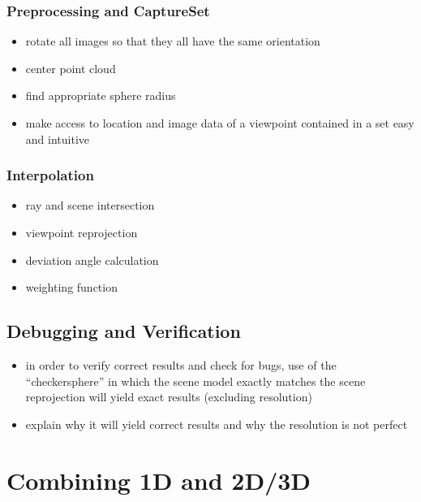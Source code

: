 \subsubsection{Preprocessing and CaptureSet}
\begin{itemize}
  \item rotate all images so that they all have the same orientation
  \item center point cloud
  \item find appropriate sphere radius
  \item make access to location and image data of a viewpoint contained in a set easy and intuitive
\end{itemize}

\subsubsection{Interpolation}
\begin{itemize}
  \item ray and scene intersection
  \item viewpoint reprojection
  \item deviation angle calculation
  \item weighting function
\end{itemize}

\subsection{Debugging and Verification}
\begin{itemize}
  \item in order to verify correct results and check for bugs, use of the ``checkersphere'' in which the scene model exactly matches the scene \ar reprojection will yield exact results (excluding resolution)
  \item explain why it will yield correct results and why the resolution is not perfect
\end{itemize}

\section{Combining 1D and 2D/3D}
